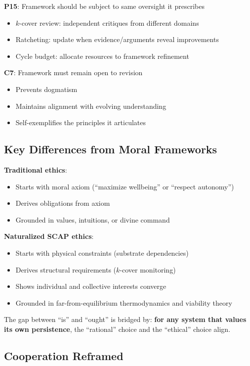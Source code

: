 \documentclass[11pt,a4paper]{article}
\theoremstyle{definition}
\begin{document}
\textbf{P15}: Framework should be subject to same oversight it prescribes
\begin{itemize}
\item $k$-cover review: independent critiques from different domains
\item Ratcheting: update when evidence/arguments reveal improvements
\item Cycle budget: allocate resources to framework refinement
\end{itemize}

\textbf{C7}: Framework must remain open to revision
\begin{itemize}
\item Prevents dogmatism
\item Maintains alignment with evolving understanding
\item Self-exemplifies the principles it articulates
\end{itemize}

\subsection{Key Differences from Moral Frameworks}

\textbf{Traditional ethics}: 
\begin{itemize}
\item Starts with moral axiom (``maximize wellbeing'' or ``respect autonomy'')
\item Derives obligations from axiom
\item Grounded in values, intuitions, or divine command
\end{itemize}

\textbf{Naturalized SCAP ethics}:
\begin{itemize}
\item Starts with physical constraints (substrate dependencies)
\item Derives structural requirements ($k$-cover monitoring)
\item Shows individual and collective interests converge
\item Grounded in far-from-equilibrium thermodynamics and viability theory
\end{itemize}

The gap between ``is'' and ``ought'' is bridged by: \textbf{for any system that values its own persistence}, the ``rational'' choice and the ``ethical'' choice align.

\subsection{Cooperation Reframed}
\end{document}

